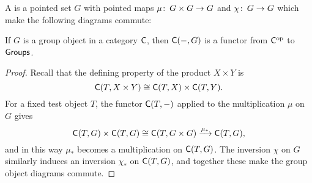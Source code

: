 \begin{definition}
A  is a pointed set $G$ with pointed maps $\mu\colon\thinspace G \times G \to G$ and $\chi\colon\thinspace G \to G$ which make the following diagrams commute:
\begin{center}
\end{center}
\end{definition}

\begin{lemma}\label{RepresentableGroupsLemma}
If $G$ is a group object in a category $\mathsf{C}$, then $\mathsf{C}(-, G)$ is a functor from $\mathsf{C}^{\mathrm{op}}$ to $\mathsf{Groups}$.
\end{lemma}
\begin{proof}
Recall that the defining property of the product $X \times Y$ is \[\mathsf{C}(T, X \times Y) \cong \mathsf{C}(T, X) \times \mathsf{C}(T, Y).\]
For a fixed test object $T$, the functor $\mathsf{C}(T, -)$ applied to the multiplication $\mu$ on $G$ gives \[\mathsf{C}(T, G) \times \mathsf{C}(T, G) \cong \mathsf{C}(T, G \times G) \xrightarrow{\mu_*} \mathsf{C}(T, G),\] and in this way $\mu_*$ becomes a multiplication on $\mathsf{C}(T, G)$.
The inversion $\chi$ on $G$ similarly induces an inversion $\chi_*$ on $\mathsf{C}(T, G)$, and together these make the group object diagrams commute.
\end{proof}

